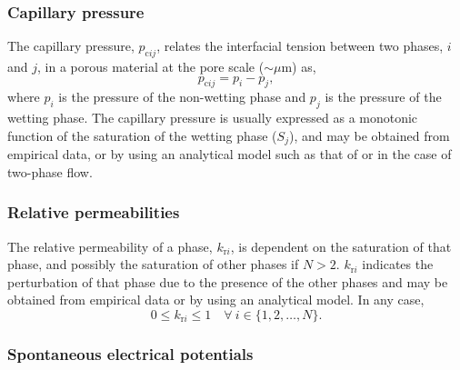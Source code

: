 \subsubsection{Capillary pressure}

The capillary pressure, $p_{\mathrm{c} i j}$, relates the interfacial tension between two phases, $i$ and $j$, in a porous material at the pore scale ($\sim \mu$m) as,
\begin{equation}\label{e:capillary}
p_{\mathrm{c} i j} = p_i - p_j,
\end{equation}
where $p_i$ is the pressure of the non-wetting phase and $p_j$ is the pressure of the wetting phase.  The capillary pressure is usually expressed as a monotonic function of the saturation of the wetting phase (\ie $S_j$), and may be obtained from empirical data, or by using an analytical model such as that of \citet{brooks1964} or \citet{vangenuchten} in the case of two-phase flow.

\subsubsection{Relative permeabilities}

The relative permeability of a phase, $k_{\mathrm{r} i}$, is dependent on the saturation of that phase, and possibly the saturation of other phases if $N > 2$.  $k_{\mathrm{r} i}$ indicates the perturbation of that phase due to the presence of the other phases and may be obtained from empirical data or by using an analytical model.  In any case,
\begin{equation}
0 \leq k_{\mathrm{r}i} \leq 1 \quad \forall\ i \in \{1,2,\dots,N\}.
\end{equation}

\subsubsection{Spontaneous electrical potentials}

